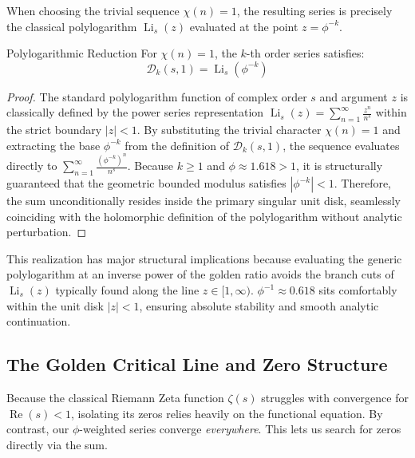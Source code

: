 When choosing the trivial sequence \(\chi(n) = 1\), the resulting series is precisely the classical polylogarithm \(\operatorname{Li}_s(z)\) evaluated at the point \(z = \phi^{-k}\).

\begin{proposition}{Polylogarithmic Reduction}{}
	For \(\chi(n) = 1\), the \(k\)-th order series satisfies:
	\[
	\mathcal{D}_k(s, 1) = \operatorname{Li}_s(\phi^{-k})
	\]
\end{proposition}
\begin{proof}
	The standard polylogarithm function of complex order \(s\) and argument \(z\) is classically defined by the power series representation \(\operatorname{Li}_s(z) = \sum_{n=1}^\infty \frac{z^n}{n^s}\) within the strict boundary \(|z| < 1\). By substituting the trivial character \(\chi(n) = 1\) and extracting the base \(\phi^{-k}\) from the definition of \(\mathcal{D}_k(s, 1)\), the sequence evaluates directly to \(\sum_{n=1}^\infty \frac{(\phi^{-k})^n}{n^s}\). Because \(k \ge 1\) and \(\phi \approx 1.618 > 1\), it is structurally guaranteed that the geometric bounded modulus satisfies \(|\phi^{-k}| < 1\). Therefore, the sum unconditionally resides inside the primary singular unit disk, seamlessly coinciding with the holomorphic definition of the polylogarithm without analytic perturbation.
\end{proof}

This realization has major structural implications because evaluating the generic polylogarithm at an inverse power of the golden ratio avoids the branch cuts of \(\operatorname{Li}_s(z)\) typically found along the line \(z \in [1, \infty)\). \(\phi^{-1} \approx 0.618\) sits comfortably within the unit disk \(|z| < 1\), ensuring absolute stability and smooth analytic continuation.

\subsection{The Golden Critical Line and Zero Structure}

Because the classical Riemann Zeta function \(\zeta(s)\) struggles with convergence for \(\operatorname{Re}(s) < 1\), isolating its zeros relies heavily on the functional equation. By contrast, our \(\phi\)-weighted series converge \textit{everywhere}. This lets us search for zeros directly via the sum.

